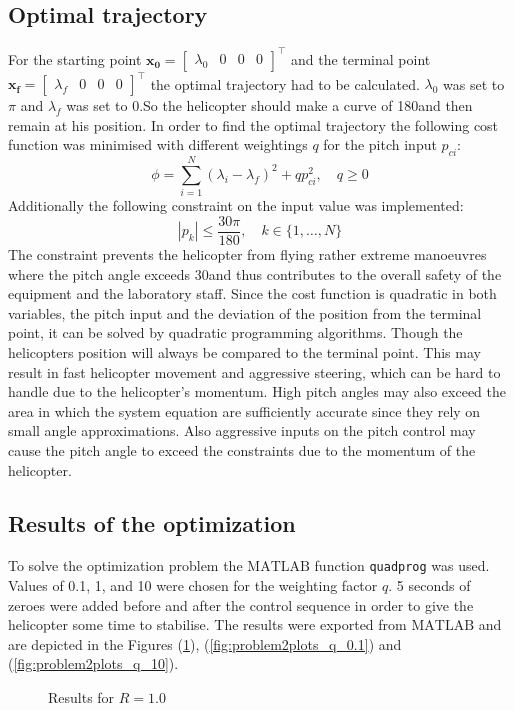 \subsection{Optimal trajectory}\label{sec:prob24}
For the starting point $\mathbf{x_0} = \begin{bmatrix} \lambda_0&0&0&0\end{bmatrix}^\top$ and the terminal point $\mathbf{x_f}=  \begin{bmatrix} \lambda_f&0&0&0\end{bmatrix}^\top$ the optimal trajectory had to be calculated. $\lambda_0$ was set to $\pi$ and $\lambda_f$ was set to $0$.So the helicopter should make a curve of 180\textdegree and then remain at his position. In order to find the optimal trajectory the following cost function was minimised with different weightings $q$ for the pitch input $p_{ci}$:
\begin{equation}
\phi = \displaystyle\sum_{i=1}^{N} (\lambda_i-\lambda_f)^2+qp_{ci}^2, \quad q \geq 0
\end{equation}
Additionally the following constraint on the input value was implemented:
\begin{equation}
	|p_k|\leq \frac {30\pi} {180}, \quad k \in \{1, \dots,N\}
\end{equation}
The constraint prevents the helicopter from flying rather extreme manoeuvres where the pitch angle exceeds 30\textdegree and thus contributes to the overall safety of the equipment and the laboratory staff. Since the cost function is quadratic in both variables, the pitch input and the deviation of the position from the terminal point, it can be solved by quadratic programming algorithms. Though the helicopters position will always be compared to the terminal point. This may result in fast helicopter movement and aggressive steering, which can be hard to handle due to the helicopter's momentum. High pitch angles may also exceed the area in which the system equation are sufficiently accurate since they rely on small angle approximations. Also aggressive inputs on the pitch control may cause the pitch angle to exceed the constraints due to the momentum of the helicopter.
\subsection{Results of the optimization}\label{sec:prob25}
To solve the optimization problem the $\mathrm{MATLAB}$ function \texttt{quadprog} was used. Values of 0.1, 1, and 10 were chosen for the weighting factor $q$. 5 seconds of zeroes were added before and after the control sequence in order to give the helicopter some time to stabilise. The results were exported from $\mathrm{MATLAB}$ and are depicted in the Figures (\ref{fig:problem2plots_q_1.0}),  (\ref{fig:problem2plots_q_0.1}) and  (\ref{fig:problem2plots_q_10}).
\begin{figure}[h]
	\centering
	\caption{Results for $R=1.0$}
	\label{fig:problem2plots_q_1.0}
\end{figure}

